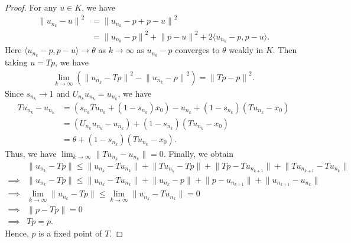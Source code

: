 \documentclass[10pt,a4paper]{amsart}
\begin{document}
\begin{proof}
For any  $u \in K$, we have 
\begin{align*}
{\lVert u_{n_k} - u \rVert}^2 
&= {\lVert u_{n_k} -p + p - u \rVert}^2\\
&= {\lVert u_{n_k} - p \rVert}^2 + {\lVert p - u \rVert}^2 + 2\langle u_{n_k} -p, p-u \rangle.
\end{align*}
Here $\langle u_{n_k} -p, p-u \rangle \to \theta$ as $k \to \infty$ as $u_{n_k} - p$ converges to $\theta$ weakly in $K$.
Then taking $u=Tp$, we have
\begin{align*}
\lim_{k \to \infty} ({\lVert u_{n_k} - Tp \rVert}^2 - {\lVert u_{n_k} - p \rVert}^2) = {\lVert Tp - p \rVert}^2.
\end{align*}
Since $s_{n_k} \to 1$ and $U_{n_k}u_{n_k}=u_{n_k}$, we have
\begin{align*}
Tu_{n_k} - u_{n_k} &= (s_{n_k} Tu_{n_k}+ (1-s_{n_k})x_0) - u_{n_k} + (1-s_{n_k})(Tu_{n_k} - x_0)\\
&=(U_{n_k}u_{n_k} -u_{n_k}) + (1-s_{n_k})(Tu_{n_k} - x_0)\\
&=\theta + (1- s_{n_k})(Tu_{n_k} - x_0). 
\end{align*}
Thus, we have $\lim_{k \to \infty} \lVert Tu_{n_k} - u_{n_k} \rVert =0$.
Finally, we obtain
\begin{align*}
&\lVert u_{n_k} - Tp \rVert \le \lVert u_{n_k} - Tu_{n_k} \rVert+ \lVert Tu_{n_k} - Tp \rVert + \lVert Tp - Tu_{n_{k+1}} \rVert+ \lVert Tu_{n_{k+1}} - Tu_{n_k} \rVert\\
\implies &\lVert u_{n_k} - Tp \rVert \le \lVert u_{n_k} - Tu_{n_k} \rVert+ \lVert u_{n_k} - p \rVert + \lVert p - u_{n_{k+1}} \rVert+ \lVert u_{n_{k+1}} - u_{n_k} \rVert\\
\implies & \lim_{k \to \infty} \lVert u_{n_k} - Tp \rVert \le \lim_{k \to \infty} \lVert u_{n_k} - Tu_{n_k} \rVert =0\\
\implies & \lVert p - Tp \rVert =0\\
\implies &Tp=p.
\end{align*}
Hence, $p$ is a fixed point of $T$.
\end{proof}
\end{document}
